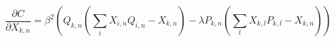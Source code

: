 \begin{equation} \label{costgrad}
    \frac{\partial C}{\partial X_{k,n}} = \beta^{2} \left( Q_{k,n} \left(\sum_{i}X_{i,n}Q_{i,n} - X_{k,n}\right) - \lambda P_{k,n} \left( \sum_{l}X_{k,l}P_{k,l} - X_{k,n}\right)\right)
\end{equation}



